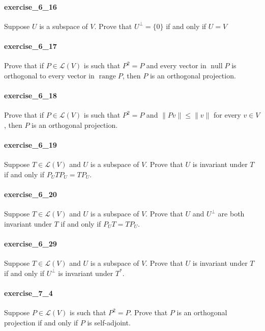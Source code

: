 \documentclass{article}
\begin{document}
\paragraph{exercise\_6\_16} Suppose $U$ is a subspace of $V$. Prove that $U^{\perp}=\{0\}$ if and only if $U=V$

\paragraph{exercise\_6\_17} Prove that if $P \in \mathcal{L}(V)$ is such that $P^{2}=P$ and every vector in $\operatorname{null} P$ is orthogonal to every vector in $\operatorname{range} P$, then $P$ is an orthogonal projection.

\paragraph{exercise\_6\_18} Prove that if $P \in \mathcal{L}(V)$ is such that $P^{2}=P$ and $\|P v\| \leq\|v\|$ for every $v \in V$, then $P$ is an orthogonal projection.

\paragraph{exercise\_6\_19} Suppose $T \in \mathcal{L}(V)$ and $U$ is a subspace of $V$. Prove that $U$ is invariant under $T$ if and only if $P_{U} T P_{U}=T P_{U}$.

\paragraph{exercise\_6\_20} Suppose $T \in \mathcal{L}(V)$ and $U$ is a subspace of $V$. Prove that $U$ and $U^{\perp}$ are both invariant under $T$ if and only if $P_{U} T=T P_{U}$.

\paragraph{exercise\_6\_29} Suppose $T \in \mathcal{L}(V)$ and $U$ is a subspace of $V$. Prove that $U$ is invariant under $T$ if and only if $U^{\perp}$ is invariant under $T^{*}$.

\paragraph{exercise\_7\_4} Suppose $P \in \mathcal{L}(V)$ is such that $P^{2}=P$. Prove that $P$ is an orthogonal projection if and only if $P$ is self-adjoint.
\end{document}
